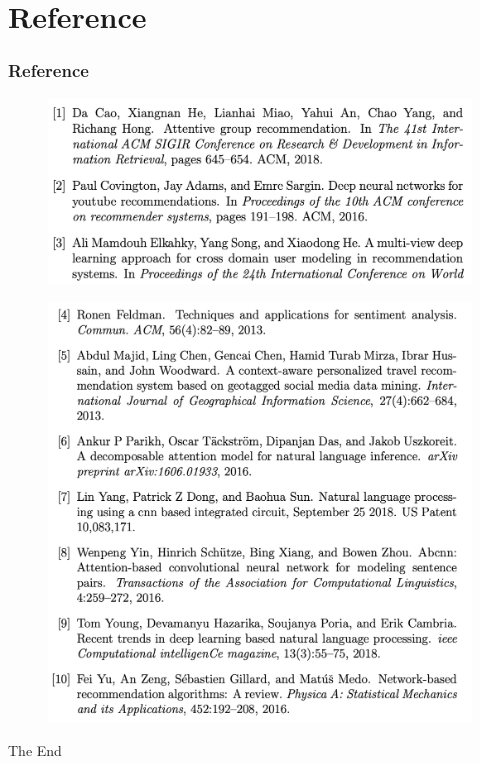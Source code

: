 \documentclass{beamer}
\begin{document}
\section{Reference}
\begin{frame}[allowframebreaks]
    \frametitle{Reference}
    \begin{figure}[]
        \centering
        \includegraphics[width=0.6\linewidth]{fig/ref1}

    \end{figure}
    \begin{figure}[]
        \centering
        \includegraphics[width=0.6\linewidth]{fig/ref2}

    \end{figure}

\end{frame}
\begin{frame}
    \Huge{\centerline{The End}}
\end{frame}

\end{document}
